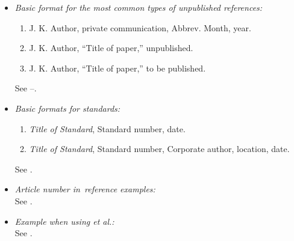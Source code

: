 \documentclass[twoside,web]{ieeecolor}
\begin{document}
\begin{itemize}
\item \emph{Basic format for the most common types of unpublished references:}
\begin{enumerate}
\item J. K. Author, private communication, Abbrev. Month, year.
\item J. K. Author, ``Title of paper,'' unpublished.
\item J. K. Author, ``Title of paper,'' to be published.
\end{enumerate}
See \cite{b27}--\cite{b29}.

\item \emph{Basic formats for standards:}
\begin{enumerate}
\item \emph{Title of Standard}, Standard number, date.
\item \emph{Title of Standard}, Standard number, Corporate author, location, date.
\end{enumerate}
See \cite{b30,b31}.

\item \emph{Article number in~reference examples:}\\
See \cite{b32,b33}.

\item \emph{Example when using et al.:}\\
See \cite{b34}.

\end{itemize}
\end{document}
